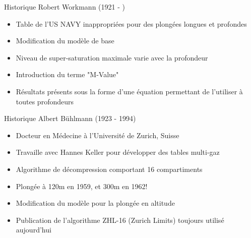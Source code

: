\begin{frame}{Historique}  
	Robert Workmann (1921 - )
	\begin{itemize}
		\item Table de l'US NAVY inappropriées pour des plongées longues et profondes
		\item Modification du modèle de base
		\item Niveau de super-saturation maximale varie avec la profondeur
		\item Introduction du terme "M-Value"
		\item Résultats présents sous la forme d'une équation permettant de l'utiliser à toutes profondeurs
	\end{itemize}
\end{frame}

\begin{frame}{Historique}  
	Albert Bühlmann (1923 - 1994)
	\begin{itemize}
		\item Docteur en Médecine à l'Université de Zurich, Suisse
		\item Travaille avec Hannes Keller pour développer des tables multi-gaz
		\item Algorithme de décompression comportant 16 compartiments
		\item Plongée à 120m en 1959, et 300m en 1962!
		\item Modification du modèle pour la plongée en altitude
		\item Publication de l'algorithme ZHL-16 (Zurich Limits) toujours utilisé aujourd'hui
	\end{itemize}
\end{frame}